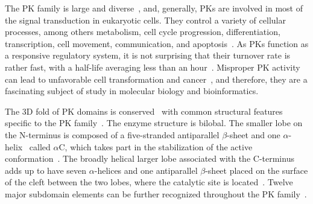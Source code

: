   The PK family is large and diverse~\cite{hanks1988protein, hunter19911}, and, generally,
  PKs are involved in most of the signal transduction in eukaryotic cells.
  They control a variety of cellular processes, among others metabolism, cell cycle
  progression, differentiation, transcription, cell movement, communication, and
  apoptosis~\cite{kemp2003amp, matsuoka1998linkage, johnson1994sequential,
  vermeulen2003transcriptional, chen1994cell, warn1998regulation, cross2000serine}.
  As PKs function as a responsive regulatory system, it is not surprising that their
  turnover rate is rather fast, with a half-life averaging less than an
  hour~\cite{hunter1982phosphotyrosine}.
  Misproper PK activity can lead to unfavorable cell transformation and
  cancer~\cite{koivunen2006protein, caretta2011protein}, and therefore, they are a
  fascinating subject of study in molecular biology and bioinformatics.

  The 3D fold of PK domains is conserved~\cite{ung2018redefining} with common structural
  features specific to the PK family~\cite{taylor1994three}.
  The enzyme structure is bilobal.
  The smaller lobe on the N-terminus is composed of a five-stranded antiparallel
  $\beta$-sheet and one $\alpha$-helix~\cite{knighton1991crystal} called $\alpha$C, which
  takes part in the stabilization of the active
  conformation~\cite{mobitz2015abc, huse2002conformational}.
  The broadly helical larger lobe associated with the C-terminus adds up to have seven
  $\alpha$-helices and one antiparallel $\beta$-sheet placed on the surface of the cleft
  between the two lobes, where the catalytic site is
  located~\cite{knighton1991crystal, taylor1994three, azam2008activation}.
  Twelve major subdomain elements can be further recognized throughout the PK
  family~\cite{hanks1988protein, hanks19912, hanks1995eukaryotic}.

